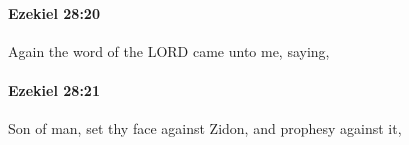 		\paragraph{Ezekiel 28:20} %
			\label{EZEKIEL-28-20}

			Again the word of the LORD came unto me, saying,


		\paragraph{Ezekiel 28:21} %
			\label{EZEKIEL-28-21}

			Son of man, set thy face against Zidon, and prophesy against it,



